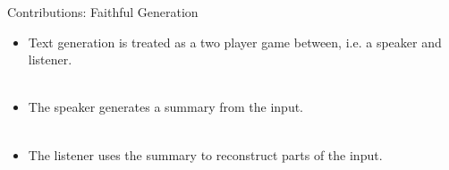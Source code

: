 \begin{frame}{Contributions: Faithful Generation}
 \begin{itemize}
   \item Text generation is treated as a two player game between, i.e. a 
       speaker  and listener. \\ ~\\
   \item The speaker generates a summary from the input.\\ ~\\
   \item The listener uses the summary to reconstruct parts of the input.
 \end{itemize}

\end{frame}
